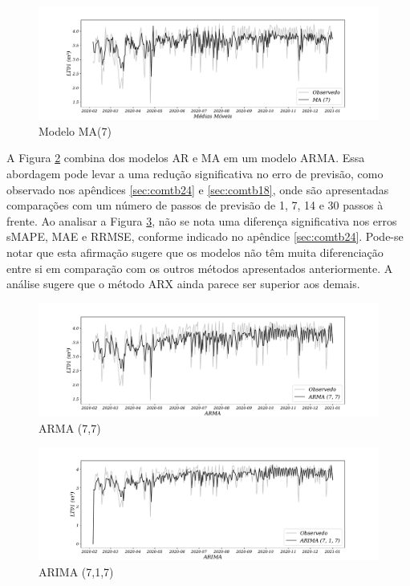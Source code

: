 \begin{figure}[H]
	\centering
	\caption{Modelo MA(7) }
	\label{fig:1-ma}
	\includegraphics[width=1\linewidth]{Modelos/Figuras/MA}
	
	
\end{figure}

A Figura \ref{fig:1-arma} combina dos modelos AR e MA em um modelo ARMA. Essa abordagem pode levar a uma redução significativa no erro de previsão, como observado nos apêndices \ref{sec:comtb24} e \ref{sec:comtb18}, onde são apresentadas comparações com um número de passos de previsão de 1, 7, 14 e 30 passos à frente.
Ao analisar a Figura \ref{fig:1-arima}, não se nota uma diferença significativa nos erros sMAPE, MAE e RRMSE, conforme indicado no apêndice \ref{sec:comtb24}. Pode-se notar que esta afirmação sugere que os modelos não têm muita diferenciação entre si em comparação com os outros métodos apresentados anteriormente. A análise sugere que o método ARX ainda parece ser superior aos demais.


\begin{figure}[H]
	\centering
	\caption{ARMA (7,7)}
	\label{fig:1-arma}
	\includegraphics[width=1\linewidth]{Modelos/Figuras/ARMA}
	
	
\end{figure}



\begin{figure}[H]
	\centering
	\caption{ARIMA (7,1,7)}
	\label{fig:1-arima}
	\includegraphics[width=1\linewidth]{Modelos/Figuras/ARIMA}
	
	
\end{figure}


